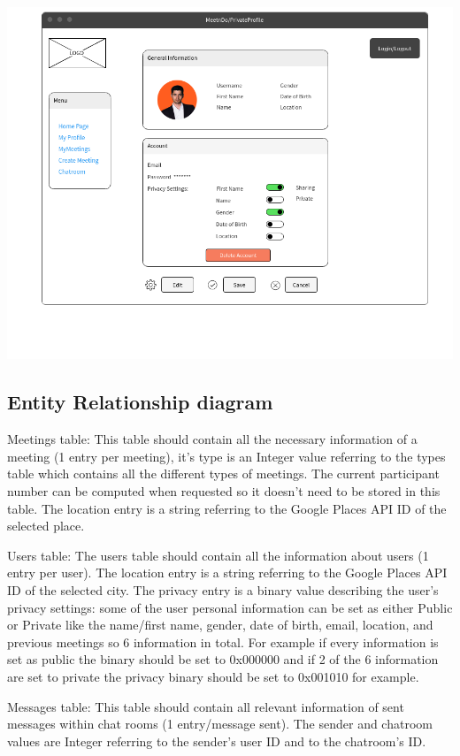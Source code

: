 \documentclass[conference]{IEEEtran}
\begin{document}
\includegraphics[scale=0.3]{pics/mockups/PrivateProfile.png}

\subsection{Entity Relationship diagram}



Meetings table: 
This table should contain all the necessary information of a meeting (1 entry per meeting), it’s type is an Integer value referring to the types table which contains all the different types of meetings. The current participant number can be computed when requested so it doesn’t need to be stored in this table. The location entry is a string referring to the Google Places API ID of the selected place.

Users table:
The users table should contain all the information about users (1 entry per user). The location entry is a string referring to the Google Places API ID of the selected city. The privacy entry is a binary value describing the user’s privacy settings: some of the user personal information can be set as either Public or Private like the name/first name, gender, date of birth, email, location, and previous meetings so 6 information in total. For example if every information is set as public the binary should be set to 0x000000 and if 2 of the 6 information are set to private the privacy binary should be set to 0x001010 for example.

Messages table:
This table should contain all relevant information of sent messages within chat rooms (1 entry/message sent). The sender and chatroom values are Integer referring to the sender’s user ID and to the chatroom’s ID.
\end{document}
